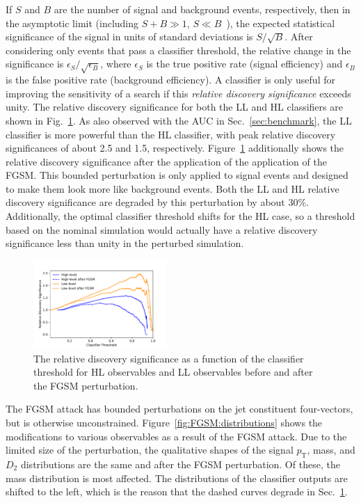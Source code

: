 \documentclass[reprint,nofootinbib,...]{revtex4-1}
\newcommand{\pt}{p_\mathrm{T}} %
\begin{document}
If $S$ and $B$ are the number of signal and background events, respectively, then in the asymptotic limit (including $S + B\gg 1$, $S\ll B$~\cite{Cowan:2010js}), the expected statistical significance of the signal in units of standard deviations is $S/\sqrt{B}$.  After considering only events that pass a classifier threshold, the relative change in the significance is $\epsilon_S/\sqrt{\epsilon_B}$, where $\epsilon_S$ is the true positive rate (signal efficiency) and $\epsilon_B$ is the false positive rate (background efficiency).   A classifier is only useful for improving the sensitivity of a search if this \textit{relative discovery significance} exceeds unity.  The relative discovery significance for both the LL and HL classifiers are shown in Fig.~\ref{fig:FGSM2}.  As also observed with the AUC in Sec.~\ref{sec:benchmark}, the LL classifier is more powerful than the HL classifier, with peak relative discovery significances of about 2.5 and 1.5, respectively.   Figure~\ref{fig:FGSM2} additionally shows the relative discovery significance after the application of the application of the FGSM.  This bounded perturbation is only applied to signal events and designed to make them look more like background events.  Both the LL and HL relative discovery significance are degraded by this perturbation by about 30\%.  Additionally, the optimal classifier threshold shifts for the HL case, so a threshold based on the nominal simulation would actually have a relative discovery significance less than unity in the perturbed simulation.

\begin{figure}[h!]
\centering
\includegraphics[width=0.45\textwidth]{figures/FGSM_Significance.pdf}
\caption{The relative discovery significance as a function of the classifier threshold for HL observables and LL observables before and after the FGSM perturbation.}
\label{fig:FGSM2}
\end{figure}

The FGSM attack has bounded perturbations on the jet constituent four-vectors, but is otherwise unconstrained.  Figure~\ref{fig:FGSM:distributions} shows the modifications to various observables as a result of the FGSM attack.   Due to the limited size of the perturbation, the qualitative shapes of the signal $\pt$, mass, and $D_2$ distributions are the same and after the FGSM perturbation.  Of these, the mass distribution is most affected.  The distributions of the classifier outputs are shifted to the left, which is the reason that the dashed curves degrade in Sec.~\ref{fig:FGSM2}.
\end{document}
